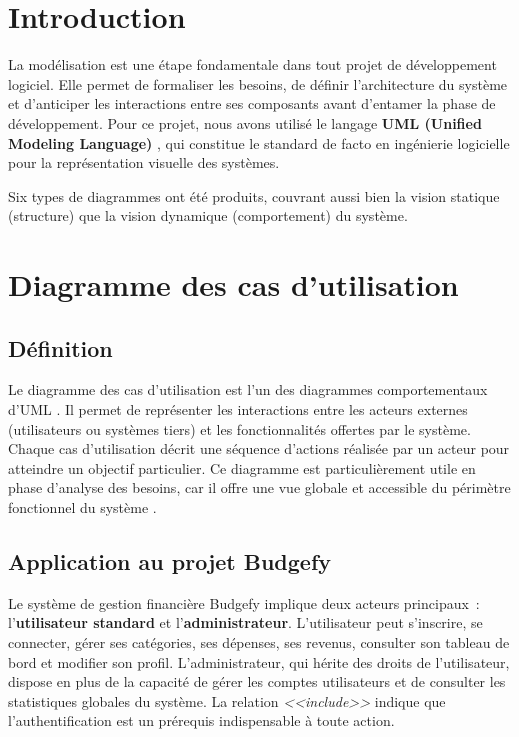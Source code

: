 \documentclass{rapportPFA}
\begin{document}
\section{Introduction}
La mod\'elisation est une \'etape fondamentale dans tout projet de d\'eveloppement
logiciel. Elle permet de formaliser les besoins, de d\'efinir l'architecture du syst\`eme
et d'anticiper les interactions entre ses composants avant d'entamer la phase de
d\'eveloppement. Pour ce projet, nous avons utilis\'e le langage
\textbf{UML (Unified Modeling Language)} \cite{uml}, qui constitue le standard de
facto en ing\'enierie logicielle pour la repr\'esentation visuelle des syst\`emes.

Six types de diagrammes ont \'et\'e produits, couvrant aussi bien la vision statique
(structure) que la vision dynamique (comportement) du syst\`eme.

\section{Diagramme des cas d'utilisation}

\subsection{D\'efinition}

Le diagramme des cas d'utilisation est l'un des diagrammes comportementaux d'UML
\cite{uml}. Il permet de repr\'esenter les interactions entre les acteurs externes
(utilisateurs ou syst\`emes tiers) et les fonctionnalit\'es offertes par le syst\`eme.
Chaque cas d'utilisation d\'ecrit une s\'equence d'actions r\'ealis\'ee par un acteur
pour atteindre un objectif particulier. Ce diagramme est particuli\`erement utile en
phase d'analyse des besoins, car il offre une vue globale et accessible du p\'erim\`etre
fonctionnel du syst\`eme \cite{pressman}.

\subsection{Application au projet Budgefy}

Le syst\`eme de gestion financi\`ere Budgefy implique deux acteurs principaux~:
l'\textbf{utilisateur standard} et l'\textbf{administrateur}. L'utilisateur peut
s'inscrire, se connecter, g\'erer ses cat\'egories, ses d\'epenses, ses revenus,
consulter son tableau de bord et modifier son profil. L'administrateur, qui h\'erite
des droits de l'utilisateur, dispose en plus de la capacit\'e de g\'erer les comptes
utilisateurs et de consulter les statistiques globales du syst\`eme. La relation
\textit{<<include>>} indique que l'authentification est un pr\'erequis indispensable
\`a toute action.
\end{document}
